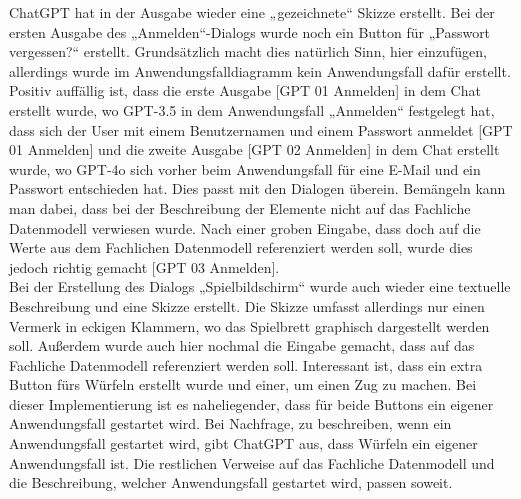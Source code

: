 ChatGPT hat in der Ausgabe wieder eine „gezeichnete“ Skizze erstellt. Bei der ersten Ausgabe des „Anmelden“-Dialogs wurde noch ein Button 
für „Passwort vergessen?“ erstellt. Grundsätzlich macht dies natürlich Sinn, hier einzufügen, allerdings wurde im Anwendungsfalldiagramm 
kein Anwendungsfall dafür erstellt. Positiv auffällig ist, dass die erste Ausgabe [GPT 01 Anmelden] in dem Chat erstellt wurde, wo GPT-3.5 
in dem Anwendungsfall „Anmelden“ festgelegt hat, dass sich der User mit einem Benutzernamen und einem Passwort anmeldet [GPT 01 Anmelden] 
und die zweite Ausgabe [GPT 02 Anmelden] in dem Chat erstellt wurde, wo GPT-4o sich vorher beim Anwendungsfall für eine E-Mail und ein 
Passwort entschieden hat. Dies passt mit den Dialogen überein. Bemängeln kann man dabei, dass bei der Beschreibung der Elemente nicht auf 
das Fachliche Datenmodell verwiesen wurde. Nach einer groben Eingabe, dass doch auf die Werte aus dem Fachlichen Datenmodell referenziert 
werden soll, wurde dies jedoch richtig gemacht [GPT 03 Anmelden].\\
Bei der Erstellung des Dialogs „Spielbildschirm“ wurde auch wieder eine textuelle Beschreibung und eine Skizze erstellt. Die Skizze umfasst 
allerdings nur einen Vermerk in eckigen Klammern, wo das Spielbrett graphisch dargestellt werden soll. Außerdem wurde auch hier nochmal die 
Eingabe gemacht, dass auf das Fachliche Datenmodell referenziert werden soll. Interessant ist, dass ein extra Button fürs Würfeln erstellt 
wurde und einer, um einen Zug zu machen. Bei dieser Implementierung ist es naheliegender, dass für beide Buttons ein eigener Anwendungsfall 
gestartet wird. Bei Nachfrage, zu beschreiben, wenn ein Anwendungsfall gestartet wird, gibt ChatGPT aus, dass Würfeln ein eigener 
Anwendungsfall ist. Die restlichen Verweise auf das Fachliche Datenmodell und die Beschreibung, welcher Anwendungsfall gestartet wird, 
passen soweit.

